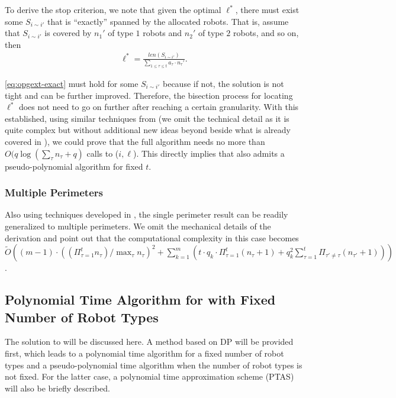 To derive the stop criterion, we note that given the optimal $\ell^*$, there must 
exist some $S_{i\sim i'}$ that is ``exactly'' spanned by the allocated robots.
That is, assume that $S_{i\sim i'}$ is covered by $n_1'$ of type $1$ robots
and $n_2'$ of type $2$ robots, and so on, then 
\begin{align}\label{eq:opgext-exact}
\ell^* = \frac{len(S_{i\sim i'})}{\sum_{1 \le \tau \le t} a_{\tau}\cdot n_{\tau}'}.
\end{align}

\eqref{eq:opgext-exact} must hold for some $S_{i\sim i'}$ because if not, the solution 
is not tight and can be further improved. Therefore, the bisection process for 
locating $\ell^*$ does not need to go on further after reaching a certain granularity\cite{fenghangaoyu2019efficient}.
With this established, using 
similar techniques from \cite{fenghangaoyu2019efficient} (we omit the technical detail as it is quite 
complex but without additional new ideas beyond beside what is already covered 
in \cite{fenghangaoyu2019efficient}), we could prove that the full algorithm needs 
no more than $O(q\log(\sum_{\tau}n_{\tau}+q)$ calls to \opglrfeasible($i, \ell$).
This directly implies that \opglr also admits a pseudo-polynomial algorithm for fixed $t$.
\subsubsection{Multiple Perimeters}
Also using techniques developed in \cite{fenghangaoyu2019efficient}, the single perimeter 
result can be readily generalized to multiple perimeters. We omit the mechanical
details of the derivation and point out that the computational complexity in this case becomes
$\tilde{O}( (m-1)\cdot((\Pi_{\tau=1}^t n_\tau) / \max_\tau n_\tau)^2 + 
\sum_{k=1}^{m} (t\cdot q_k\cdot \Pi_{{\tau}=1}^{t}(n_{\tau}+1)+
q_k^2\sum_{{\tau}=1}^{t} \Pi_{{\tau'}\neq {\tau}} (n_{\tau'} +1)))$.

\subsection{Polynomial Time Algorithm for \opgmc with Fixed Number of Robot Types}
The solution to \opgmc will be discussed here. A method based on DP 
will be provided first, which leads to a polynomial time algorithm for a 
fixed number of robot types and a pseudo-polynomial time algorithm when the number 
of robot types is not fixed. For the latter case, a polynomial time approximation 
scheme (PTAS) will also be briefly described.
